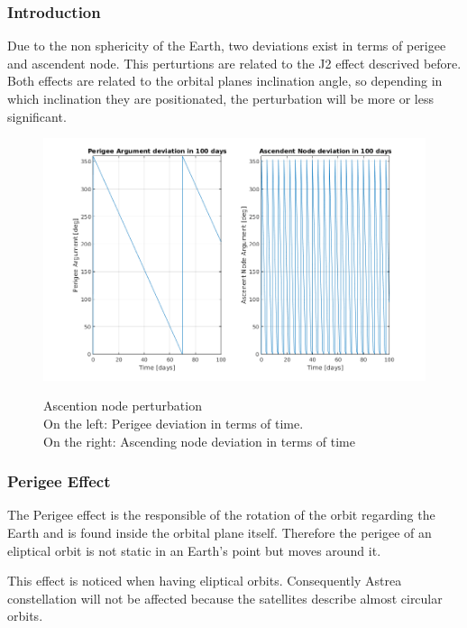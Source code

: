 \subsubsection{Introduction}

Due to the non sphericity of the Earth, two deviations exist in terms of perigee and ascendent node. This perturtions are related to the J2 effect descrived before.
Both effects are related to the orbital planes inclination angle, so depending in which inclination they are positionated, the perturbation will be more or less  significant.

\begin{figure}[H] %
	\centering
	\includegraphics[width=.8\textwidth]{./decay/Inclination.png}\\
	\caption{Ascention node perturbation\\
			On the left: Perigee deviation in terms of time.\\
			On the right: Ascending node deviation in terms of time}
	\label{fig:Inclination} 
\end{figure}

\subsubsection{Perigee Effect}

The Perigee effect is the responsible of the rotation of the orbit regarding the Earth and is found inside the orbital plane itself. Therefore the perigee of an eliptical orbit is not static in an Earth's point but moves around it. 

This effect is noticed when having eliptical orbits. Consequently Astrea constellation will not be affected because the satellites describe almost circular orbits.


